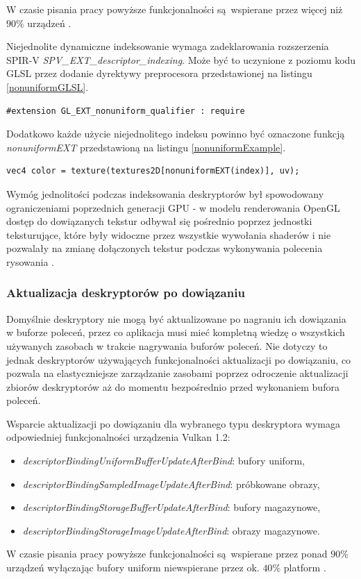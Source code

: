 W czasie pisania pracy powyższe funkcjonalności są wspierane przez więcej niż $90\%$ urządzeń \cite{GPUINFO}.

Niejednolite dynamiczne indeksowanie wymaga zadeklarowania rozszerzenia SPIR-V \textit{SPV\_EXT\_descriptor\_indexing}.
Może być to uczynione z poziomu kodu GLSL przez dodanie dyrektywy preprocesora przedstawionej na listingu \ref{nonuniformGLSL}.
\lstset{language=GLSL}
\begin{lstlisting}[caption={Dyrektywa preprocesora dla niejednolitych indeksów},captionpos=b,label={nonuniformGLSL}]
#extension GL_EXT_nonuniform_qualifier : require
\end{lstlisting}
Dodatkowo każde użycie niejednolitego indeksu powinno być oznaczone funkcją \textit{nonuniformEXT} przedstawioną na listingu \ref{nonuniformExample}.
\lstset{language=GLSL}
\begin{lstlisting}[caption={Próbkowanei używając niejednolitego indeksu},captionpos=b,label={nonuniformExample}]
vec4 color = texture(textures2D[nonuniformEXT(index)], uv);
\end{lstlisting}

Wymóg jednolitości podczas indeksowania deskryptorów był spowodowany ograniczeniami poprzednich generacji GPU - w modelu renderowania OpenGL dostęp do dowiązanych tekstur odbywał się pośrednio poprzez jednostki teksturujące, które były widoczne przez wszystkie wywołania shaderów i nie pozwalały na zmianę dołączonych tekstur podczas wykonywania polecenia rysowania \cite{GPUGEM4}. 

\subsubsection {Aktualizacja deskryptorów po dowiązaniu}

Domyślnie deskryptory nie mogą być aktualizowane po nagraniu ich dowiązania w buforze poleceń, przez co aplikacja musi mieć kompletną wiedzę o wszystkich używanych zasobach w trakcie nagrywania buforów poleceń.
Nie dotyczy to jednak deskryptorów używających funkcjonalności aktualizacji po dowiązaniu, co pozwala na elastyczniejsze zarządzanie zasobami poprzez odroczenie aktualizacji zbiorów deskryptorów aż do momentu bezpośrednio przed wykonaniem bufora poleceń.

Wsparcie aktualizacji po dowiązaniu dla wybranego typu deskryptora wymaga odpowiedniej funkcjonalności urządzenia Vulkan 1.2:
\begin{itemize}
	\item {\textit{descriptorBindingUniformBufferUpdateAfterBind}}: bufory uniform,
	\item {\textit{descriptorBindingSampledImageUpdateAfterBind}}: próbkowane obrazy,
	\item {\textit{descriptorBindingStorageBufferUpdateAfterBind}}: bufory magazynowe,
	\item {\textit{descriptorBindingStorageImageUpdateAfterBind}}: obrazy magazynowe.
\end{itemize}
W czasie pisania pracy powyższe funkcjonalności są wspierane przez ponad $90\%$ urządzeń wyłączając bufory uniform niewspierane przez ok. $40\%$ platform \cite{GPUINFO}.

